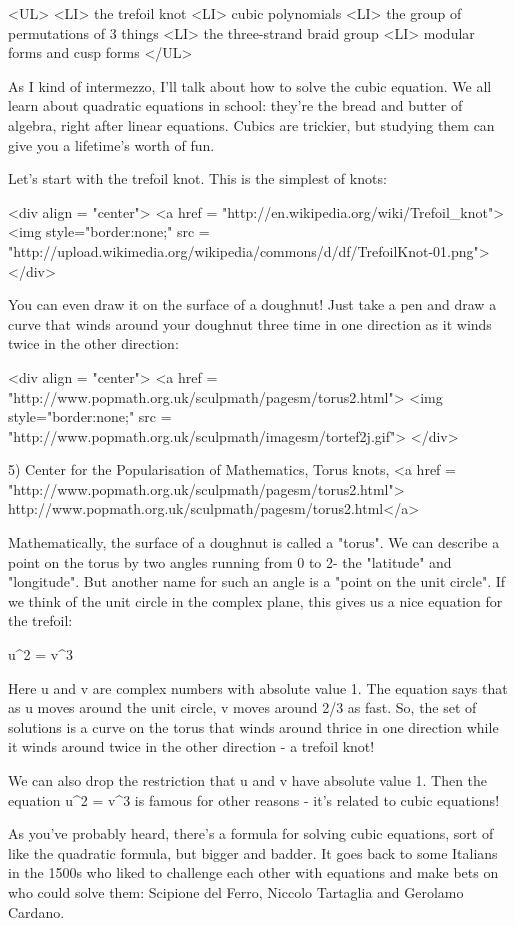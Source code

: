 <UL>
<LI>
  the trefoil knot
<LI>
  cubic polynomials
<LI>
  the group of permutations of 3 things
<LI>
  the three-strand braid group
<LI>
  modular forms and cusp forms
</UL>

As I kind of intermezzo, I'll talk about how to solve the cubic 
equation.  We all learn about quadratic equations in school: 
they're the bread and butter of algebra, right after linear 
equations.  Cubics are trickier, but studying them can give you
a lifetime's worth of fun.

Let's start with the trefoil knot.  This is the simplest of knots:

<div align = "center">
<a href = "http://en.wikipedia.org/wiki/Trefoil_knot">
<img style="border:none;" src = "http://upload.wikimedia.org/wikipedia/commons/d/df/TrefoilKnot-01.png">
</div>

You can even draw it on the surface of a doughnut!  Just take a pen
and draw a curve that winds around your doughnut three time in one
direction as it winds twice in the other direction:

<div align = "center">
<a href = "http://www.popmath.org.uk/sculpmath/pagesm/torus2.html">
<img style="border:none;" src = "http://www.popmath.org.uk/sculpmath/imagesm/tortef2j.gif">
</div>

5) Center for the Popularisation of Mathematics, Torus knots,
<a href = "http://www.popmath.org.uk/sculpmath/pagesm/torus2.html">
http://www.popmath.org.uk/sculpmath/pagesm/torus2.html</a>

Mathematically, the surface of a doughnut is called a "torus".
We can describe a point on the torus by two angles running
from 0 to 2\pi  - the "latitude" and "longitude".  But another name 
for such an angle is a "point on the unit circle".  If we think
of the unit circle in the complex plane, this gives us a nice
equation for the trefoil: 

u^{2} = v^{3}

Here u and v are complex numbers with absolute value 1.  The equation 
says that as u moves around the unit circle, v moves around 2/3 as 
fast.  So, the set of solutions is a curve on the torus that winds 
around thrice in one direction while it winds around twice in the
other direction - a trefoil knot!

We can also drop the restriction that u and v have absolute
value 1.  Then the equation u^{2} = v^{3} is famous for other reasons -
it's related to cubic equations!   

As you've probably heard, there's a formula for solving cubic equations,
sort of like the quadratic formula, but bigger and badder.  It goes 
back to some Italians in the 1500s who liked to challenge each other 
with equations and make bets on who could solve them: Scipione del 
Ferro, Niccolo Tartaglia and Gerolamo Cardano.

